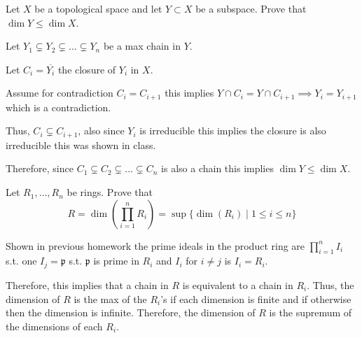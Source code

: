 \documentclass[12pt, letterpaper]{article}
\newcommand{\p}{\mathfrak{p}}
\begin{document}
\color{\TextColor}
\pagecolor{\colormode}
\setlength{\parindent}{0pt}
\pagestyle{fancy}
\fancyhf{}

\begin{problem}{}
    Let $X$ be a topological space and let $Y \subset X$ be a subspace. Prove that $\dim Y \leq \dim X$.
\end{problem}
\begin{problemproof}
    Let $Y_1 \subsetneq Y_2 \subsetneq \dots \subsetneq Y_n$ be a max chain in $Y$.

    Let $C_i = \overline{Y_i}$ the closure of $Y_i$ in $X$.

    Assume for contradiction $C_i = C_{i+1}$  this implies $Y \cap C_i = Y \cap C_{i+1} \implies Y_i = Y_{i+1}$ which is a contradiction.

    Thus, $C_i \subsetneq C_{i+1}$, also since $Y_i$ is irreducible this implies the closure is also irreducible this was shown in class.

    Therefore, since $C_1 \subsetneq C_2 \subsetneq \dots \subsetneq C_n$ is also a chain this implies $\dim Y \leq \dim X$.
\end{problemproof}

\begin{problem}{}
    Let $R_1,\dots,R_n$ be rings. Prove that
    \[R=\dim \left(  \prod_{i=1}^n R_i \right) = \sup \{\dim(R_i) \mid 1 \leq i \leq n\}\]
\end{problem}
\begin{problemproof}
    Shown in previous homework the prime ideals in the product ring are $\prod_{i=1}^n I_i$ s.t. one $I_j=\p$ s.t. $\p$ is prime in $R_i$ and $I_i$ for $i \neq j$ is $I_i=R_i$.

    Therefore, this implies that a chain in $R$ is equivalent to a chain in $R_i$. Thus, the dimension of $R$ is the max of the $R_i$'s if each dimension is finite and if otherwise then the dimension is infinite. Therefore, the dimension of $R$ is the supremum of the dimensions of each $R_i$.
\end{problemproof}
\end{document}
